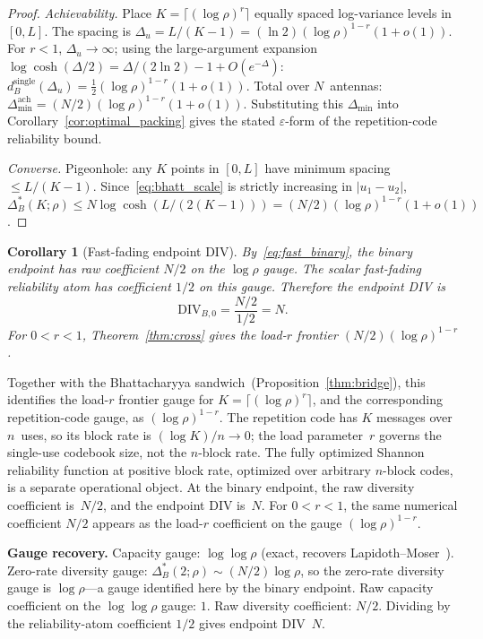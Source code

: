 \documentclass[lettersize,onecolumn]{IEEEtran}
\newtheorem{corollary}{Corollary}
\newcommand{\snr}{\rho}
\begin{document}
\begin{proof}
\emph{Achievability.} Place $K = \lceil(\log\snr)^r\rceil$ equally
spaced log-variance levels in $[0,L]$. The spacing is
$\Delta_u = L/(K-1) = (\ln 2)(\log\snr)^{1-r}(1+o(1))$.
For $r < 1$, $\Delta_u \to \infty$; using the large-argument
expansion $\log\cosh(\Delta/2) = \Delta/(2\ln 2) - 1 + O(e^{-\Delta})$:
$d_B^{\mathrm{single}}(\Delta_u) = \tfrac{1}{2}(\log\snr)^{1-r}
(1+o(1))$. Total over $N$~antennas:
$\Delta_{\min}^{\mathrm{ach}}
= (N/2)(\log\snr)^{1-r}(1+o(1))$.
Substituting this $\Delta_{\min}$ into
Corollary~\ref{cor:optimal_packing} gives the stated
$\varepsilon$-form of the repetition-code reliability bound.

\emph{Converse.} Pigeonhole: any $K$ points in $[0,L]$ have minimum
spacing $\le L/(K-1)$. Since~\eqref{eq:bhatt_scale} is strictly
increasing in $|u_1-u_2|$, $\Delta_B^*(K;\snr) \le
N\log\cosh(L/(2(K-1))) = (N/2)(\log\snr)^{1-r}(1+o(1))$.
\end{proof}

\begin{corollary}[Fast-fading endpoint DIV]
\label{cor:fast_div}
By~\eqref{eq:fast_binary}, the binary endpoint has raw coefficient
$N/2$ on the $\log\snr$ gauge.
The scalar fast-fading reliability atom has
coefficient $1/2$ on this gauge. Therefore the
endpoint DIV is
\[
  \mathrm{DIV}_{B,0} = \frac{N/2}{1/2} = N.
\]
For $0 < r < 1$, Theorem~\ref{thm:cross} gives the load-$r$
frontier $(N/2)(\log\snr)^{1-r}$.
\end{corollary}

Together with the Bhattacharyya
sandwich~(Proposition~\ref{thm:bridge}), this identifies the load-$r$ frontier gauge for
$K=\lceil(\log\snr)^r\rceil$, and the
corresponding repetition-code gauge, as $(\log\snr)^{1-r}$.
The repetition code has $K$ messages over $n$~uses, so its block rate
is $(\log K)/n \to 0$; the load parameter~$r$ governs the single-use
codebook size, not the $n$-block rate. The fully optimized Shannon
reliability function at positive block rate, optimized over arbitrary
$n$-block codes, is a separate operational object. At
the binary endpoint, the raw diversity coefficient is~$N/2$, and the
endpoint DIV is~$N$. For $0 < r < 1$, the same numerical coefficient
$N/2$ appears as the load-$r$ coefficient on the gauge
$(\log\snr)^{1-r}$.

\textbf{Gauge recovery.}
Capacity gauge: $\log\log\snr$ (exact, recovers
Lapidoth--Moser~\cite{LapidothMoser2003}).
Zero-rate diversity gauge: $\Delta_B^*(2;\snr) \sim (N/2)\log\snr$,
so the zero-rate diversity gauge is $\log\snr$---a gauge identified
here by the binary endpoint.
Raw capacity coefficient on the $\log\log\snr$ gauge: $1$. Raw
diversity coefficient: $N/2$. Dividing by the reliability-atom
coefficient $1/2$ gives endpoint DIV~$N$.
\end{document}
